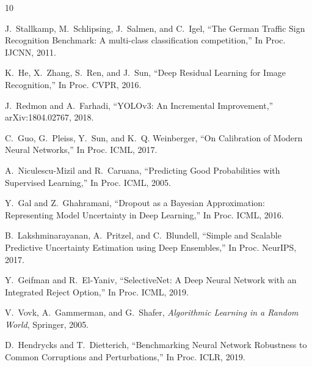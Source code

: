 \documentclass[11pt,a4paper]{article}
\begin{document}
\begin{thebibliography}{10}

J.~Stallkamp, M.~Schlipsing, J.~Salmen, and C.~Igel,
\newblock ``The German Traffic Sign Recognition Benchmark: A multi-class classification competition,''
\newblock In Proc. IJCNN, 2011.

K.~He, X.~Zhang, S.~Ren, and J.~Sun,
\newblock ``Deep Residual Learning for Image Recognition,''
\newblock In Proc. CVPR, 2016.

J.~Redmon and A.~Farhadi,
\newblock ``YOLOv3: An Incremental Improvement,''
\newblock arXiv:1804.02767, 2018.

C.~Guo, G.~Pleiss, Y.~Sun, and K.~Q. Weinberger,
\newblock ``On Calibration of Modern Neural Networks,''
\newblock In Proc. ICML, 2017.

A.~Niculescu-Mizil and R.~Caruana,
\newblock ``Predicting Good Probabilities with Supervised Learning,''
\newblock In Proc. ICML, 2005.

Y.~Gal and Z.~Ghahramani,
\newblock ``Dropout as a Bayesian Approximation: Representing Model Uncertainty in Deep Learning,''
\newblock In Proc. ICML, 2016.

B.~Lakshminarayanan, A.~Pritzel, and C.~Blundell,
\newblock ``Simple and Scalable Predictive Uncertainty Estimation using Deep Ensembles,''
\newblock In Proc. NeurIPS, 2017.

Y.~Geifman and R.~El-Yaniv,
\newblock ``SelectiveNet: A Deep Neural Network with an Integrated Reject Option,''
\newblock In Proc. ICML, 2019.

V.~Vovk, A.~Gammerman, and G.~Shafer,
\newblock \emph{Algorithmic Learning in a Random World},
\newblock Springer, 2005.

D.~Hendrycks and T.~Dietterich,
\newblock ``Benchmarking Neural Network Robustness to Common Corruptions and Perturbations,''
\newblock In Proc. ICLR, 2019.

\end{thebibliography}
\end{document}
